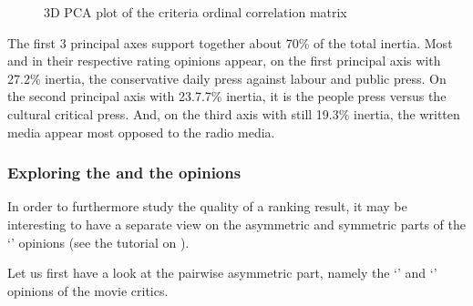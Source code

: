 \documentclass[a4paper,12pt,english]{sphinxhowto}
\let\sphinxpxdimen\pdfpxdimen\else\newdimen\sphinxpxdimen
\begin{document}
\begin{sphinxVerbatim}[commandchars=\\\{\}]
\end{sphinxVerbatim}

\begin{figure}[H]
\centering
\capstart

\noindent\sphinxincludegraphics[width=400\sphinxpxdimen]{{correlationPCA}.png}
\caption{3D PCA plot of the criteria ordinal correlation matrix}\label{\detokenize{pearls:correlationpca}}\end{figure}

\sphinxAtStartPar
The first 3 principal axes support together about 70\% of the total inertia. Most  and  in their respective rating opinions appear, on the first principal axis with 27.2\% inertia, the conservative daily press against labour and public press. On the second principal axis with 23.7.7\% inertia, it is the people press versus the cultural critical press. And, on the third axis with still 19.3\% inertia, the written media appear most opposed to the radio media.


\subsubsection{Exploring the   and the  opinions}
\label{\detokenize{pearls:exploring-the-better-rated-and-the-as-well-as-rated-opinions}}
\sphinxAtStartPar
In order to furthermore study the quality of a ranking result, it may be interesting to have a separate view on the asymmetric and symmetric parts of the ‘’ opinions (see the tutorial on ).

\sphinxAtStartPar
Let us first have a look at the pairwise asymmetric part, namely the ‘’ and ‘’ opinions of the movie critics.

\begin{sphinxVerbatim}[commandchars=\\\{\}]
   
  
\end{sphinxVerbatim}
\end{document}
